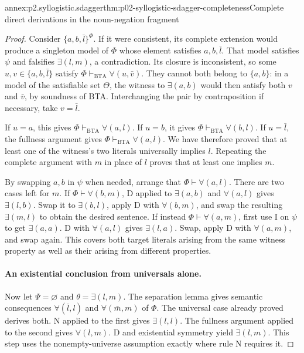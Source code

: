 \begin{annexitem}{annex:p2.syllogistic.sdagger}{thm:p02-syllogistic-sdagger-completeness}{Complete direct derivations in the noun-negation fragment}
\begin{proof}
Consider \(\{a,b,\bar l\}^\Phi\). If it were consistent, its complete
extension would produce a singleton model of \(\Phi\) whose element
satisfies \(a,b,\bar l\). That model satisfies \(\psi\) and falsifies
\(\exists(l,m)\), a contradiction. Its closure is inconsistent, so
some \(u,v\in\{a,b,\bar l\}\) satisfy
\(\Phi\vdash_{\mathrm{BTA}}\forall(u,\bar v)\).
They cannot both belong to \(\{a,b\}\): in a model of the satisfiable
set \(\Theta\), the witness to \(\exists(a,b)\) would then satisfy
both \(v\) and \(\bar v\), by soundness of BTA. Interchanging the pair
by contraposition if necessary, take \(v=\bar l\).

If \(u=a\), this gives \(\Phi\vdash_{\mathrm{BTA}}\forall(a,l)\).
If \(u=b\), it gives \(\Phi\vdash_{\mathrm{BTA}}\forall(b,l)\).
If \(u=\bar l\), the fullness argument gives
\(\Phi\vdash_{\mathrm{BTA}}\forall(a,l)\). We have therefore proved
that at least one of the witness's two literals universally implies \(l\).
Repeating the complete argument with \(m\) in place of \(l\) proves that
at least one implies \(m\).

By swapping \(a,b\) in \(\psi\) when needed, arrange that
\(\Phi\vdash\forall(a,l)\). There are two cases left for \(m\).
If \(\Phi\vdash\forall(b,m)\), D applied to
\(\exists(a,b)\) and \(\forall(a,l)\) gives \(\exists(l,b)\).
Swap it to \(\exists(b,l)\), apply D with \(\forall(b,m)\), and swap
the resulting \(\exists(m,l)\) to obtain the desired sentence.
If instead \(\Phi\vdash\forall(a,m)\), first use I on \(\psi\)
to get \(\exists(a,a)\). D with \(\forall(a,l)\) gives
\(\exists(l,a)\). Swap, apply D with \(\forall(a,m)\), and swap again.
This covers both target literals arising from the same witness property
as well as their arising from different properties.

\paragraph{An existential conclusion from universals alone.}
Now let \(\Psi=\varnothing\) and \(\theta=\exists(l,m)\).
The separation lemma gives semantic consequences
\(\forall(\bar l,l)\) and \(\forall(\bar m,m)\) of \(\Phi\).
The universal case already proved derives both. N applied to the first
gives \(\exists(l,l)\). The fullness argument applied to the second
gives \(\forall(l,m)\). D and existential symmetry yield
\(\exists(l,m)\). This step uses the nonempty-universe assumption exactly
where rule N requires it.


\end{proof}
\end{annexitem}
